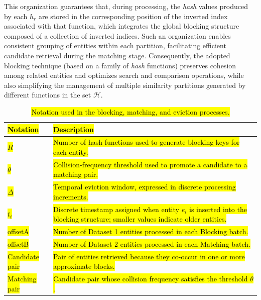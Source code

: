 \documentclass{ieeeaccess}
\begin{document}
This organization guarantees that, during processing, the \textit{hash} values produced by each \( h_r \) are stored in the corresponding position of the inverted index associated with that function, which integrates the global blocking structure composed of a collection of inverted indices. Such an organization enables consistent grouping of entities within each partition, facilitating efficient candidate retrieval during the matching stage. Consequently, the adopted blocking technique (based on a family of \textit{hash} functions) preserves cohesion among related entities and optimizes search and comparison operations, while also simplifying the management of multiple similarity partitions generated by different functions in the set \( \mathcal{H} \).

\begin{table}[!t]
\centering
\caption{\hl{Notation used in the blocking, matching, and eviction processes.}}
\label{tab:notation}
\scriptsize
\renewcommand{\arraystretch}{1.05}
\begin{tabularx}{\columnwidth}{
    >{\centering\arraybackslash}p{}
    >{\raggedright\arraybackslash}X
}
\hline
\hl{\textbf{Notation}} & \hl{\textbf{Description}} \\
\hline
\hl{$R$} &
\hl{Number of hash functions used to generate blocking keys for each entity.} \\

\hl{$\theta$} &
\hl{Collision-frequency threshold used to promote a candidate to a matching pair.} \\

\hl{$\Delta$} &
\hl{Temporal eviction window, expressed in discrete processing increments.} \\

\hl{$t_i$} &
\hl{Discrete timestamp assigned when entity $e_i$ is inserted into the blocking structure; smaller values indicate older entities.} \\

\hl{offsetA} &
\hl{Number of Dataset 1 entities processed in each Blocking batch.} \\

\hl{offsetB} &
\hl{Number of Dataset 2 entities processed in each Matching batch.} \\

\hl{Candidate pair} &
\hl{Pair of entities retrieved because they co-occur in one or more approximate blocks.} \\

\hl{Matching pair} &
\hl{Candidate pair whose collision frequency satisfies the threshold $\theta$.} \\

\hline
\end{tabularx}
\end{table}
\end{document}
